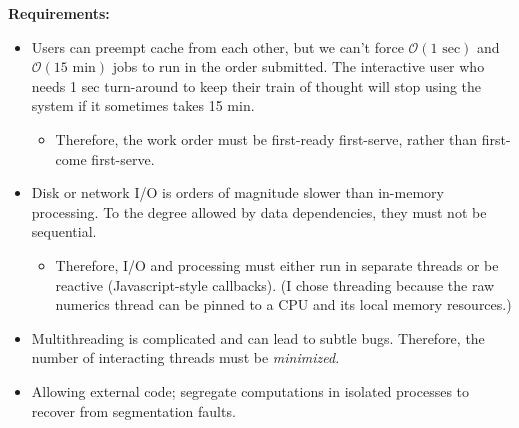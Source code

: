 \documentclass{beamer}
\begin{document}
\begin{frame}
\vspace{0.5 cm}
{\bf Requirements:}

\small
\begin{itemize}
\item Users can preempt cache from each other, but we can't force $\mathcal{O}(\mbox{1 sec})$ and $\mathcal{O}(\mbox{15 min})$ jobs to run in the order submitted. The interactive user who needs 1 sec turn-around to keep their train of thought will stop using the system if it sometimes takes 15 min.
\begin{itemize}
\item Therefore, the work order must be first-ready first-serve, rather than first-come first-serve.
\end{itemize}

\item Disk or network I/O is orders of magnitude slower than in-memory processing. To the degree allowed by data dependencies, they must not be sequential.
\begin{itemize}
\item Therefore, I/O and processing must either run in separate threads or be reactive (Javascript-style callbacks). (I chose threading because the raw numerics thread can be pinned to a CPU and its local memory resources.)
\end{itemize}

\item Multithreading is complicated and can lead to subtle bugs. Therefore, the number of interacting threads must be {\it minimized.}

\item Allowing external code; segregate computations in isolated processes to recover from segmentation faults.

\end{itemize}
\end{frame}
\end{document}
